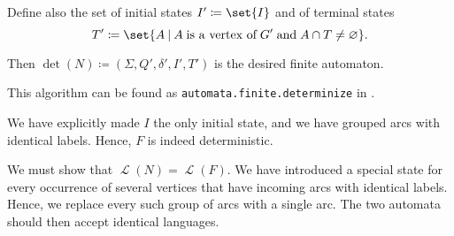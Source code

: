 \begin{algorithm}
\begin{thmenum}
    Define also the set of initial states \( I' \coloneqq \set{ I } \) and of terminal states
    \begin{equation*}
      T' \coloneqq \set{ A \given A \T{is a vertex of} G' \T{and} A \cap T \neq \varnothing }.
    \end{equation*}

    Then \( \det(N) \coloneqq (\Sigma, Q', \delta', I', T') \) is the desired finite automaton.
  \end{thmenum}
\end{algorithm}
\begin{comments}
  \item This algorithm can be found as \texttt{automata.finite.determinize} in \cite{code}.
\end{comments}
\begin{defproof}
  We have explicitly made \( I \) the only initial state, and we have grouped arcs with identical labels. Hence, \( F \) is indeed deterministic.

  We must show that \( \mscrL(N) = \mscrL(F) \). We have introduced a special state for every occurrence of several vertices that have incoming arcs with identical labels. Hence, we replace every such group of arcs with a single arc. The two automata should then accept identical languages.
\end{defproof}


